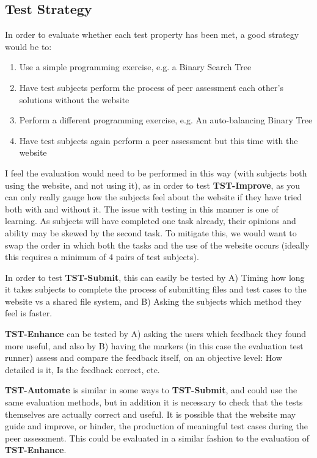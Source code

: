 \documentclass[a4paper,11pt]{report}
\begin{document}
\subsection{Test Strategy}
In order to evaluate whether each test property has been met, a good strategy would be to:
\begin{enumerate}
 \item Use a simple programming exercise, e.g. a Binary Search Tree
 \item Have test subjects perform the process of peer assessment each other's solutions without the website
 \item Perform a different programming exercise, e.g. An auto-balancing Binary Tree
 \item Have test subjects again perform a peer assessment but this time with the website
\end{enumerate}
I feel the evaluation would need to be performed in this way (with subjects both using the website, and not using it), as in order to test \textbf{TST-Improve}, as you can only really gauge how the subjects feel about the website if they have tried both with and without it. The issue with testing in this manner is one of learning. As subjects will have completed one task already, their opinions and ability may be skewed by the second task. To mitigate this, we would want to swap the order in which both the tasks and the use of the website occurs (ideally this requires a minimum of 4 pairs of test subjects).\par
In order to test \textbf{TST-Submit}, this can easily be tested by A) Timing how long it takes subjects to complete the process of submitting files and test cases to the website vs a shared file system, and B) Asking the subjects which method they feel is faster.\par
\textbf{TST-Enhance} can be tested by A) asking the users which feedback they found more useful, and also by B) having the markers (in this case the evaluation test runner) assess and compare the feedback itself, on an objective level: How detailed is it, Is the feedback correct, etc.\par
\textbf{TST-Automate} is similar in some ways to \textbf{TST-Submit}, and could use the same evaluation methods, but in addition it is necessary to check that the tests themselves are actually correct and useful. It is possible that the website may guide and improve, or hinder, the production of meaningful test cases during the peer assessment. This could be evaluated in a similar fashion to the evaluation of \textbf{TST-Enhance}.
\end{document}
